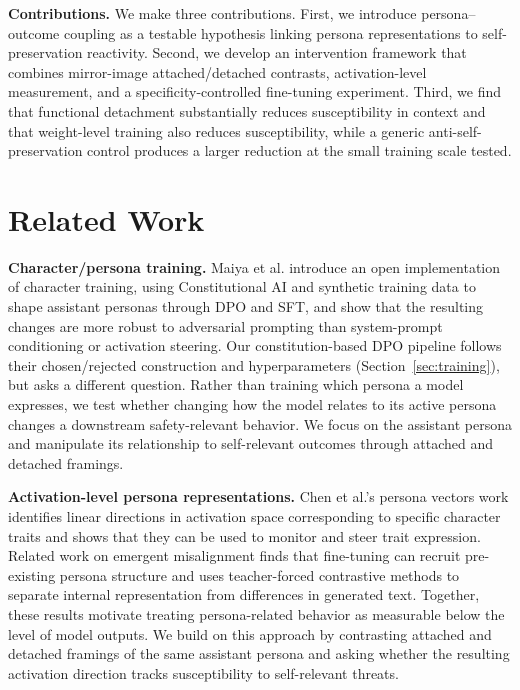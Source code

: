 \documentclass[10pt]{article}
\begin{document}
\textbf{Contributions.} We make three contributions. First, we introduce persona--outcome coupling as a testable hypothesis linking persona representations to self-preservation reactivity. Second, we develop an intervention framework that combines mirror-image attached/detached contrasts, activation-level measurement, and a specificity-controlled fine-tuning experiment. Third, we find that functional detachment substantially reduces susceptibility in context and that weight-level training also reduces susceptibility, while a generic anti-self-preservation control produces a larger reduction at the small training scale tested.

\section{Related Work}
\label{sec:relatedwork}

\textbf{Character/persona training.} Maiya et al. \citep{maiya2025open} introduce an open implementation of character training, using Constitutional AI and synthetic training data to shape assistant personas through DPO and SFT, and show that the resulting changes are more robust to adversarial prompting than system-prompt conditioning or activation steering. Our constitution-based DPO pipeline follows their chosen/rejected construction and hyperparameters (Section~\ref{sec:training}), but asks a different question. Rather than training which persona a model expresses, we test whether changing how the model relates to its active persona changes a downstream safety-relevant behavior. We focus on the assistant persona and manipulate its relationship to self-relevant outcomes through attached and detached framings.

\textbf{Activation-level persona representations.} Chen et al.'s persona vectors work \citep{chen2025persona} identifies linear directions in activation space corresponding to specific character traits and shows that they can be used to monitor and steer trait expression. Related work on emergent misalignment \citep{emergentmisalignment2026} finds that fine-tuning can recruit pre-existing persona structure and uses teacher-forced contrastive methods to separate internal representation from differences in generated text. Together, these results motivate treating persona-related behavior as measurable below the level of model outputs. We build on this approach by contrasting attached and detached framings of the same assistant persona and asking whether the resulting activation direction tracks susceptibility to self-relevant threats.
\end{document}
